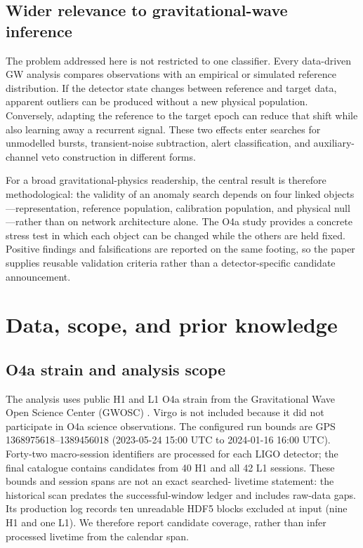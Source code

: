 \documentclass[12pt]{article}
\begin{document}
\subsection{Wider relevance to gravitational-wave inference}

The problem addressed here is not restricted to one classifier.  Every
data-driven GW analysis compares observations with an empirical or simulated
reference distribution.  If the detector state changes between reference and
target data, apparent outliers can be produced without a new physical
population.  Conversely, adapting the reference to the target epoch can reduce
that shift while also learning away a recurrent signal.  These two effects
enter searches for unmodelled bursts, transient-noise subtraction, alert
classification, and auxiliary-channel veto construction in different forms.

For a broad gravitational-physics readership, the central result is therefore
methodological: the validity of an anomaly search depends on four linked
objects---representation, reference population, calibration population, and
physical null---rather than on network architecture alone.  The O4a study
provides a concrete stress test in which each object can be changed while the
others are held fixed.  Positive findings and falsifications are reported on
the same footing, so the paper supplies reusable validation criteria rather
than a detector-specific candidate announcement.

\section{Data, scope, and prior knowledge}
\label{sec:data}

\subsection{O4a strain and analysis scope}

The analysis uses public H1 and L1 O4a strain from the Gravitational Wave Open
Science Center (GWOSC) \cite{gwosc_o4a_release,gwosc2023}.  Virgo is not included
because it did not participate in O4a science observations.  The configured
run bounds are GPS 1368975618--1389456018 (2023-05-24 15:00 UTC to
2024-01-16 16:00 UTC).  Forty-two macro-session identifiers are processed for
each LIGO detector; the final catalogue contains candidates from 40 H1 and all
42 L1 sessions.  These bounds and session spans are not an exact searched-
livetime statement: the historical scan predates the successful-window ledger
and includes raw-data gaps.  Its production log records ten unreadable HDF5
blocks excluded at input (nine H1 and one L1).  We therefore report candidate
coverage, rather than infer processed livetime from the calendar span.
\end{document}
